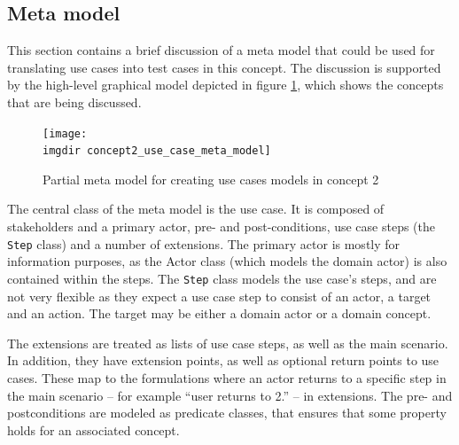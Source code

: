 \subsection{Meta model}
This section contains a brief discussion of a meta model that could be used for translating use cases into test cases in this concept. The discussion is supported by the high-level graphical model depicted in figure \ref{fig:concept2_use_case_meta_model}, which shows the concepts that are being discussed.\medskip

\begin{figure}[h]
  \centering
  \texttt{[image: \\imgdir concept2\_use\_case\_meta\_model]}
  \caption{Partial meta model for creating use cases models in concept 2}
  \label{fig:concept2_use_case_meta_model}
\end{figure}

\noindent The central class of the meta model is the use case. It is composed of stakeholders and a primary actor, pre- and post-conditions, use case steps (the \texttt{Step} class) and a number of extensions. The primary actor is mostly for information purposes, as the Actor class (which models the domain actor) is also contained within the steps. The \texttt{Step} class models the use case's steps, and are not very flexible as they expect a use case step to consist of an actor, a target and an action. The target may be either a domain actor or a domain concept.\medskip

\noindent The extensions are treated as lists of use case steps, as well as the main scenario. In addition, they have extension points, as well as optional return points to use cases. These map to the formulations where an actor returns to a specific step in the main scenario -- for example ``user returns to 2.'' -- in extensions. The pre- and postconditions are modeled as predicate classes, that ensures that some property holds for an associated concept.

